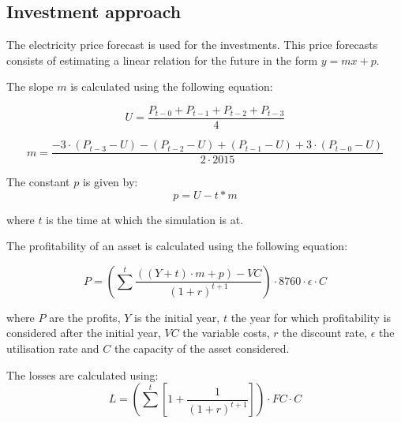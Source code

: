 
\subsection{Investment approach}
\label{ssec:elecInvestments}

The electricity price forecast is used for the investments. This price forecasts consists of estimating a linear relation for the future in the form $y = mx + p$.

The slope $m$ is calculated using the following equation:

\begin{equation}
U = \frac{P_{t-0} + P_{t-1} + P_{t-2} + P_{t-3}}{4}
\end{equation}

\begin{equation}
m = \frac{- 3 \cdot \left(P_{t-3} - U \right) -  \left(P_{t-2} - U \right) + \left(P_{t-1} -  U \right) + 3 \cdot \left (P_{t-0} -  U \right)}{2 \cdot 2015}
\end{equation}

The constant $p$ is given by:
\begin{equation}
p = U - t * m
\end{equation}

where $t$ is the time at which the simulation is at.

The profitability of an asset is calculated using the following equation:

\begin{equation}
P = \left( \sum^t \frac{((Y+t) \cdot m + p) - VC}{(1 + r)^{t+1}} \right) \cdot 8760 \cdot \epsilon \cdot C
\end{equation}

where $P$ are the profits, $Y$ is the initial year, $t$ the year for which profitability is considered after the initial year, $VC$ the variable costs, $r$ the discount rate, $\epsilon$ the utilisation rate and $C$ the capacity of the asset considered.

The losses are calculated using:
\begin{equation}
L = \left( \sum^t \left[1 + \frac{1}{(1 + r)^{t+1}} \right] \right) \cdot FC \cdot C
\end{equation}

